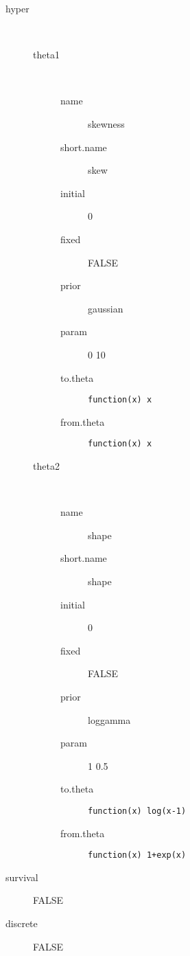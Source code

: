 \begin{description}
	\item[hyper]\ 
	 \begin{description}
	 	\item[theta1]\ 
	 	 \begin{description}
	 	 	 \item[ name ] skewness 
	 	 	 \item[ short.name ] skew 
	 	 	 \item[ initial ] 0 
	 	 	 \item[ fixed ] FALSE 
	 	 	 \item[ prior ] gaussian 
	 	 	 \item[ param ] 0 10 
	 	 	 \item[ to.theta ] \verb|function(x) x| 
	 	 	 \item[ from.theta ] \verb|function(x) x| 
	 	 \end{description}
	 	\item[theta2]\ 
	 	 \begin{description}
	 	 	 \item[ name ] shape 
	 	 	 \item[ short.name ] shape 
	 	 	 \item[ initial ] 0 
	 	 	 \item[ fixed ] FALSE 
	 	 	 \item[ prior ] loggamma 
	 	 	 \item[ param ] 1 0.5 
	 	 	 \item[ to.theta ] \verb|function(x) log(x-1)| 
	 	 	 \item[ from.theta ] \verb|function(x) 1+exp(x)| 
	 	 \end{description}
	 \end{description}
	 \item[ survival ] FALSE 
	 \item[ discrete ] FALSE 
\end{description}
